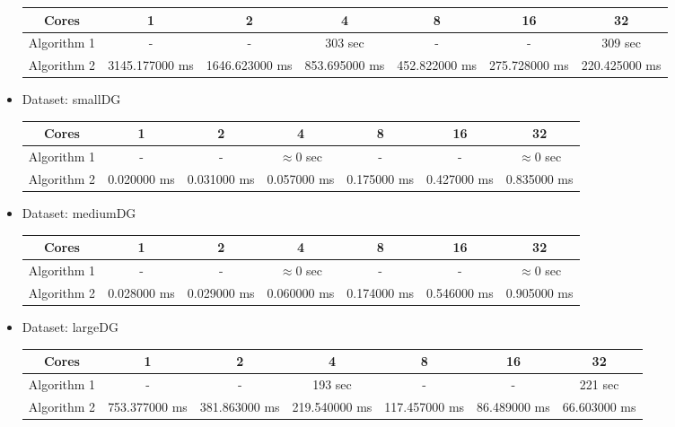 \documentclass[a4paper]{article}
\begin{document}
\begin{itemize}
    \hspace{-4.0cm}
    \begin{tabular}{|c|c|c|c|c|c|c|}
        \hline
        Cores & 1 & 2 & 4 & 8 & 16 & 32 \\
        \hline
        Algorithm 1 & - & - &  303 sec & - & - & 309 sec \\
        \hline
        Algorithm 2 & 3145.177000 ms & 1646.623000 ms & 853.695000 ms & 452.822000 ms & 275.728000 ms & 220.425000 ms \\
        \hline
    \end{tabular}
    
    \item Dataset: smallDG
    \\
    
    \hspace{-4.0cm}
    \begin{tabular}{|c|c|c|c|c|c|c|}
        \hline
        Cores & 1 & 2 & 4 & 8 & 16 & 32 \\
        \hline
        Algorithm 1 & - & - &  $\approx$0 sec & - & - & $\approx$0 sec \\
        \hline
        Algorithm 2 & 0.020000 ms & 0.031000 ms & 0.057000 ms & 0.175000 ms & 0.427000 ms & 0.835000 ms \\
        \hline
    \end{tabular}
    
    \item Dataset: mediumDG
    \\
    
    \hspace{-4.0cm}
    \begin{tabular}{|c|c|c|c|c|c|c|}
        \hline
        Cores & 1 & 2 & 4 & 8 & 16 & 32 \\
        \hline
        Algorithm 1 & - & - &  $\approx$0 sec & - & - & $\approx$0 sec \\
        \hline
        Algorithm 2 & 0.028000 ms & 0.029000 ms & 0.060000 ms & 0.174000 ms & 0.546000 ms & 0.905000 ms \\
        \hline
    \end{tabular}
    
    \item Dataset: largeDG
    \\
    
    \hspace{-4.0cm}
    \begin{tabular}{|c|c|c|c|c|c|c|}
        \hline
        Cores & 1 & 2 & 4 & 8 & 16 & 32 \\
        \hline
        Algorithm 1 & - & - &  193 sec & - & - & 221 sec \\
        \hline
        Algorithm 2 & 753.377000 ms & 381.863000 ms & 219.540000 ms & 117.457000 ms & 86.489000 ms & 66.603000 ms \\
        \hline
    \end{tabular}
\end{itemize}
\end{document}
